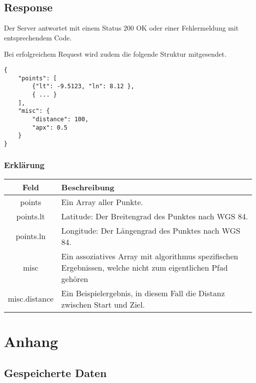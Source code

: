 \documentclass[ngerman]{scrartcl}
\begin{document}
	\subsection*{Response}
	
	Der Server antwortet mit einem Status 200 OK oder einer Fehlermeldung mit entsprechendem Code.
	
	Bei erfolgreichem Request wird zudem die folgende Struktur mitgesendet.
	
	\begin{lstlisting}
{
	"points": [
		{"lt": -9.5123, "ln": 8.12 },
		{ ... }
	],
	"misc": {
		"distance": 100,
		"apx": 0.5
	}
}
	\end{lstlisting}
	
		\subsubsection*{Erklärung}
		
		\begin{tabular}{|c|p{12cm}|}
			\hline
			\textbf{Feld} & \textbf{Beschreibung} \\ 
			\hline \hline
			
			points & Ein Array aller Punkte.\\
			\hline
			
	    	points.lt & Latitude: Der Breitengrad des Punktes nach WGS 84. \\ 
	    	\hline
	    	
	    	points.ln & Longitude: Der Längengrad des Punktes nach WGS 84. \\
	    	\hline
	    	
	    	misc & Ein assoziatives Array mit algorithmus spezifischen Ergebnissen, welche nicht zum eigentlichen Pfad gehören \\
	    	\hline
	    	
	    	misc.distance & Ein Beispielergebnis, in diesem Fall die Distanz zwischen Start und Ziel.\\
	    	\hline
		\end{tabular}
	

\section{Anhang}

	\subsection{Gespeicherte Daten}
	
\end{document}
